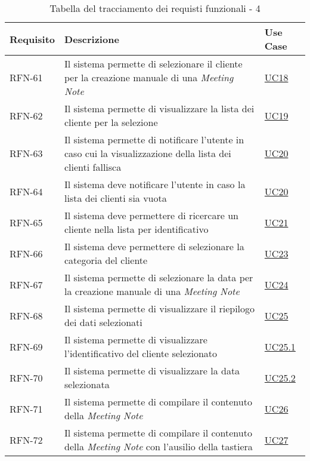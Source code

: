 \begin{table}%
    \caption{Tabella del tracciamento dei requisti funzionali - 4}
    \label{tab:requisiti-funzionali-4}
    \begin{tabularx}{\textwidth}{lXl}
    \hline\hline
    \textbf{Requisito} & \textbf{Descrizione} & \textbf{Use Case}\\
    \hline
    RFN-61 \label{RFN-61} & Il sistema permette di selezionare il cliente per la creazione manuale di una \emph{Meeting Note} & \hyperref[UC18]{UC18} \\
    \hline
    RFN-62 \label{RFN-62} & Il sistema permette di visualizzare la lista dei cliente per la selezione & \hyperref[UC19]{UC19} \\
    \hline
    RFN-63 \label{RFN-63} & Il sistema permette di notificare l'utente in caso cui la visualizzazione della lista dei clienti fallisca & \hyperref[UC20]{UC20} \\
    \hline
    RFN-64 \label{RFN-64} & Il sistema deve notificare l'utente in caso la lista dei clienti sia vuota & \hyperref[UC20]{UC20} \\ %
    \hline
    RFN-65 \label{RFN-65} & Il sistema deve permettere di ricercare un cliente nella lista per identificativo & \hyperref[UC21]{UC21} \\
    \hline
    RFN-66 \label{RFN-66} & Il sistema deve permettere di selezionare la categoria del cliente & \hyperref[UC23]{UC23} \\
    \hline
    RFN-67 \label{RFN-67} & Il sistema permette di selezionare la data per la creazione manuale di una \emph{Meeting Note} & \hyperref[UC24]{UC24} \\
    \hline
    RFN-68 \label{RFN-68} & Il sistema permette di visualizzare il riepilogo dei dati selezionati & \hyperref[UC25]{UC25} \\
    \hline
    RFN-69 \label{RFN-69} & Il sistema permette di visualizzare l'identificativo del cliente selezionato & \hyperref[UC25.1]{UC25.1} \\
    \hline
    RFN-70 \label{RFN-70} & Il sistema permette di visualizzare la data selezionata & \hyperref[UC25.2]{UC25.2} \\
    \hline
    RFN-71 \label{RFN-71} & Il sistema permette di compilare il contenuto della \emph{Meeting Note} & \hyperref[UC26]{UC26} \\
    \hline
    RFN-72 \label{RFN-72} & Il sistema permette di compilare il contenuto della \emph{Meeting Note} con l'ausilio della tastiera & \hyperref[UC27]{UC27} \\

\end{tabularx}
\end{table}

